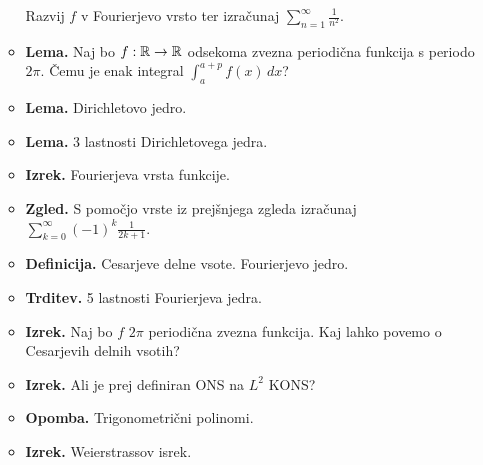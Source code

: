 \begin{enumerate}
\begin{itemize}
        Razvij \(f\) v Fourierjevo vrsto ter izračunaj \(\sum_{n=1}^{\infty} \frac{1}{n^2}\).
        \item \textbf{Lema.} Naj bo \(f: \mathbb{R} \to \mathbb{R}\) odsekoma zvezna periodična funkcija s periodo \(2\pi\). Čemu je enak integral \(\int_{a}^{a+p} f(x) \, dx\)?
        \item \textbf{Lema.} Dirichletovo jedro.
        \item \textbf{Lema.} 3 lastnosti Dirichletovega jedra.
        \item \textbf{Izrek.} Fourierjeva vrsta funkcije. \todo{*}
        \item \textbf{Zgled.} S pomočjo vrste iz prejšnjega zgleda izračunaj \(\sum_{k=0}^{\infty}(-1)^{k}\frac{1}{2k+1}\).
        \item \textbf{Definicija.} Cesarjeve delne vsote. Fourierjevo jedro.
        \item \textbf{Trditev.} 5 lastnosti Fourierjeva jedra.
        \item \textbf{Izrek.} Naj bo \(f\) \(2\pi\) periodična zvezna funkcija. Kaj lahko povemo o Cesarjevih delnih vsotih?
        \item \textbf{Izrek.} Ali je prej definiran ONS na \(L^2\) KONS?
        \item \textbf{Opomba.} Trigonometrični polinomi.
        \item \textbf{Izrek.} Weierstrassov isrek.
    \end{itemize}
\end{enumerate}
